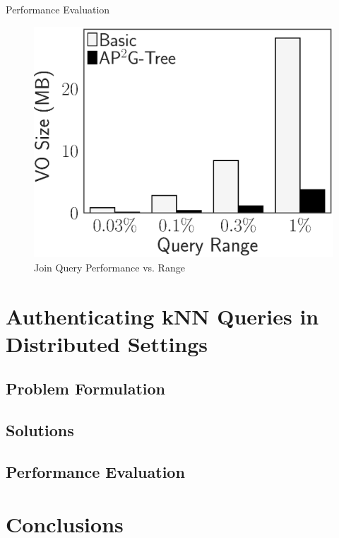 \documentclass[xcolor={dvipsnames},aspectratio=169,10pt]{beamer}
\begin{document}
\begin{frame}{Performance Evaluation}
\begin{figure}
    \includegraphics[height=\ht\figbox]{exp-figs/access-control/join_vo.eps}
    \caption{Join Query Performance vs. Range}
  \end{figure}
\end{frame}

\section{Authenticating {kNN} Queries in Distributed Settings}

\subsection{Problem Formulation}

\subsection{Solutions}

\subsection{Performance Evaluation}

\section{Conclusions}
\end{document}
